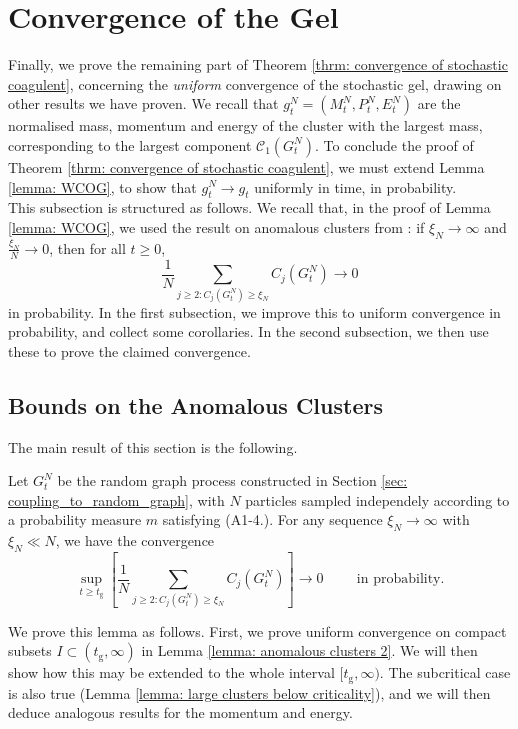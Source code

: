 \section{Convergence of the Gel} \label{sec: COG}
Finally, we prove the remaining part of Theorem \ref{thrm: convergence of stochastic coagulent}, concerning the \emph{uniform} convergence of the stochastic gel, drawing on other results we have proven. We recall that $g^N_t=(M^N_t, P^N_t, E^N_t)$ are the normalised mass, momentum and energy of the cluster with the largest mass, corresponding to the largest component $\mathcal{C}_1(G^N_t).$ To conclude the proof of Theorem \ref{thrm: convergence of stochastic coagulent}, we must extend Lemma \ref{lemma: WCOG}, to show that $g^N_t\rightarrow g_t$ uniformly in time, in probability. \medskip \\ This subsection is structured as follows. We recall that, in the proof of Lemma \ref{lemma: WCOG}, we used the result on anomalous clusters from \cite{BJR07}: if $\xi_N\rightarrow \infty$ and $\frac{\xi_N}{N}\rightarrow 0$, then for all $t\ge 0$,  \begin{equation} \frac{1}{N}\sum_{j\ge 2: C_j(G^N_t)\ge \xi_N} C_j(G^N_t)\rightarrow 0 \end{equation} in probability. In the first subsection, we improve this to uniform convergence in probability, and collect some corollaries. In the second subsection, we then use these to prove the claimed convergence.
\subsection{Bounds on the Anomalous Clusters} The main result of this section is the following.
\begin{lemma} \label{lemma: anomalous clusters} Let $G^N_t$ be the random graph process constructed in Section \ref{sec: coupling_to_random_graph}, with $N$ particles sampled independely according to a probability measure $m$ satisfying (A1-4.). For any sequence $\xi_N\rightarrow \infty$ with $\xi_N\ll N$, we have the convergence \begin{equation}
       \sup_{t \geq t_\mathrm{g}}\left[\frac{1}{N}\sum_{j\geq 2: C_j(G^N_t)\geq \xi_N} C_j(G^N_t)\right] \rightarrow 0 \hspace{1cm}\text{in probability.}\end{equation} 
        \end{lemma} 
       
       We prove this lemma as follows. First, we prove uniform convergence  on compact subsets $I\subset (t_\mathrm{g}, \infty)$ in Lemma \ref{lemma: anomalous clusters 2}. We will then show how this may be extended to the whole interval $[t_\mathrm{g}, \infty)$. The subcritical case is also true (Lemma \ref{lemma: large clusters below criticality}), and we will then deduce analogous results for the momentum and energy.
       
